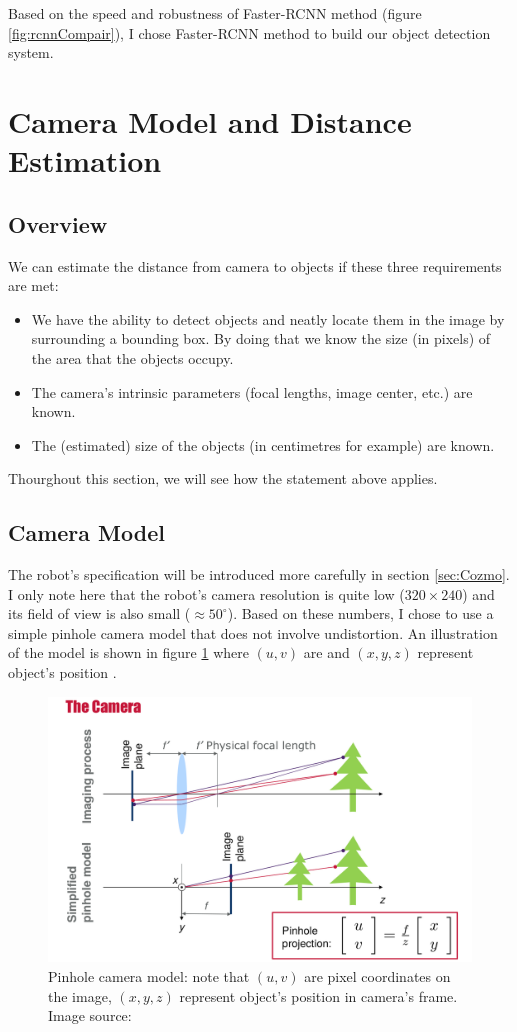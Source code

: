 Based on the speed and robustness of Faster-RCNN method (figure \ref{fig:rcnnCompair}), I chose Faster-RCNN method to build our object detection system.


\section{Camera Model and Distance Estimation}
\label{sec:camModel}
\subsection{Overview}
We can estimate the distance from camera to objects if these three requirements are met: 
\begin{itemize}
	\item We have the ability to detect objects and neatly locate them in the image by surrounding a bounding box. By doing that we know the size (in pixels) of the area that the objects occupy.
	\item The camera's intrinsic parameters (focal lengths, image center, etc.) are known.
	\item The (estimated) size of the objects (in centimetres for example) are known.
\end{itemize}
Thourghout this section, we will see how the statement above applies. 

\subsection{Camera Model}
The robot's specification will be introduced more carefully in section \ref{sec:Cozmo}. I only note here that the robot's camera resolution is quite low ($320 \times 240$) and its field of view is also small ($\approx 50 ^{\circ}$). Based on these numbers, I chose to use a simple pinhole camera model that does not involve undistortion. An illustration of the model is shown in figure \ref{fig:pinhole} where $(u, v)$ are  and $(x,y,z)$ represent object's position .

\begin{figure}[tb]
	\centering
	\includegraphics[width=0.9\hsize]{./figures/pinhole}
	\caption{Pinhole camera model: note that $(u, v)$ are pixel coordinates on the image, $(x,y,z)$ represent object's position in camera's frame. Image source: \cite{c433}}
	\label{fig:pinhole}
\end{figure}

